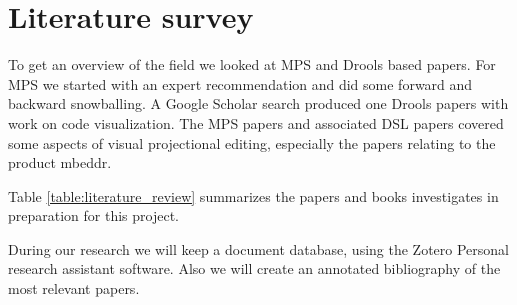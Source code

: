 \section{Literature survey}

To get an overview of the field we looked at MPS and Drools based papers.  
For MPS we started with an expert recommendation and did some forward and backward snowballing.
A Google Scholar search produced one Drools papers with work on code visualization. 
The MPS papers and associated DSL papers covered some aspects of visual projectional editing, especially the papers relating to the product mbeddr.

Table \ref{table:literature_review} summarizes the papers and books investigates in preparation for this project.

During our research we will keep a document database, using the Zotero Personal research assistant software\cite{Zotero_product_page}.
Also we will create an annotated bibliography of the most relevant papers.


